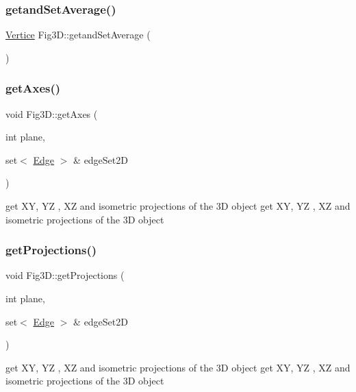 \subsubsection{\texorpdfstring{getand\+Set\+Average()}{getandSetAverage()}}
{\footnotesize\ttfamily \hyperlink{structVertice}{Vertice} Fig3\+D\+::getand\+Set\+Average (\begin{DoxyParamCaption}{ }\end{DoxyParamCaption})}

\mbox{\label{classFig3D_a4fbcfab626ef2fe938bc53dec4c0543a}} 
\subsubsection{\texorpdfstring{get\+Axes()}{getAxes()}}
{\footnotesize\ttfamily void Fig3\+D\+::get\+Axes (\begin{DoxyParamCaption}\item[{int}]{plane,  }\item[{set$<$ \hyperlink{structEdge}{Edge} $>$ \&}]{edge\+Set2D }\end{DoxyParamCaption})}

get XY, YZ , XZ and isometric projections of the 3D object get XY, YZ , XZ and isometric projections of the 3D object \mbox{\label{classFig3D_af1000067e4e230b41059896c8cacd4e1}} 
\subsubsection{\texorpdfstring{get\+Projections()}{getProjections()}}
{\footnotesize\ttfamily void Fig3\+D\+::get\+Projections (\begin{DoxyParamCaption}\item[{int}]{plane,  }\item[{set$<$ \hyperlink{structEdge}{Edge} $>$ \&}]{edge\+Set2D }\end{DoxyParamCaption})}

get XY, YZ , XZ and isometric projections of the 3D object get XY, YZ , XZ and isometric projections of the 3D object \mbox{\label{classFig3D_a25a3607c2735064d0bc0081b271ea224}} 
